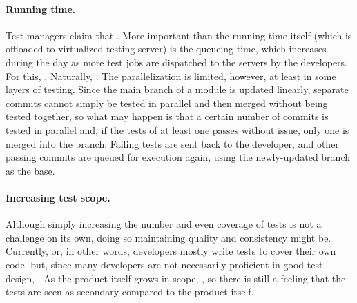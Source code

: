\paragraph{Running time.} Test managers claim that .
More important than the running time itself (which is offloaded to virtualized testing server) is the queueing time, which increases during the day as more test jobs are dispatched to the servers by the developers. 
For this, .
Naturally, .
The parallelization is limited, however, at least in some layers of testing.
Since the main branch of a module is updated linearly, separate commits cannot simply be tested in parallel and then merged without being tested together, so what may happen is that a certain number of commits is tested in parallel and, if the tests of at least one passes without issue, only one is merged into the branch.
Failing tests are sent back to the developer, and other passing commits are queued for execution again, using the newly-updated branch as the base.

\paragraph{Increasing test scope.} Although simply increasing the number and even coverage of tests is not a challenge on its own, doing so maintaining quality and consistency might be.
Currently,  or, in other words, developers mostly write tests to cover their own code.
 but, since many developers are not necessarily proficient in good test design, .
As the product itself grows in scope, , so there is still a feeling that the tests are seen as secondary compared to the product itself.

